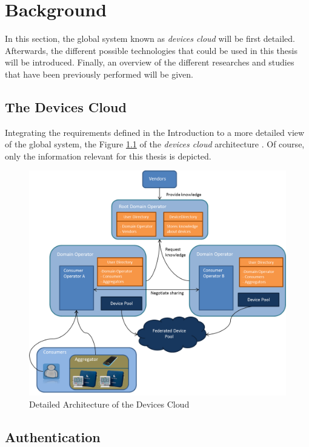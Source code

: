 \chapter{Background}
\label{cha:relatedwork}

In this section, the global system known as \emph{devices cloud} will be first detailed. Afterwards, the different possible technologies that could be used in this thesis will be introduced. Finally, an overview of the different researches and studies that have been previously performed will be given.
 
\section{The Devices Cloud}
Integrating the requirements defined in the Introduction to a more detailed view of the global system, the Figure \ref{fig:design_complete} of the \emph{devices cloud} architecture . Of course, only the information relevant for this thesis is depicted.

\begin{figure}[!ht]
	\centering
	\includegraphics[scale=0.6]{images/design_complete}
	\caption{Detailed Architecture of the Devices Cloud}
	\label{fig:design_complete}
\end{figure}

\section{Authentication}
